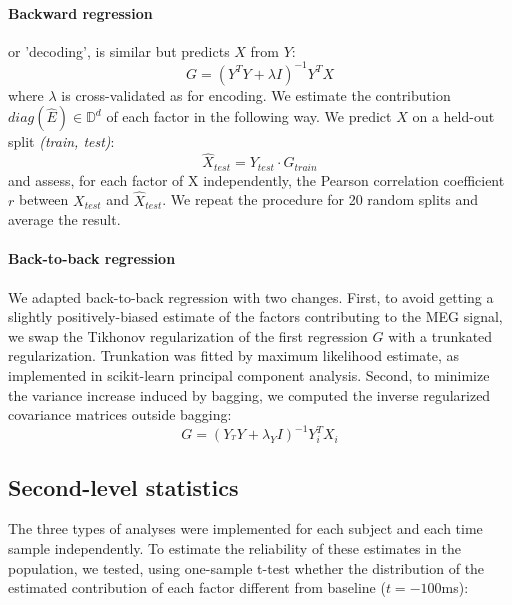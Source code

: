 \paragraph{Backward regression} or 'decoding', is similar but predicts $X$ from $Y$:
\begin{equation} G = (Y^{T}Y+\lambda I)^{-1} Y^{T}X \end{equation}
where $\lambda$ is cross-validated as for encoding. We estimate the
contribution $diag(\hat E) \in\mathbb{D}^{d} $ of each factor in the following
way. We predict $X$ on a held-out split \textit{(train, test)}:
\begin{equation} \hat X_{test} = Y_{test}\cdot G_{train} \end{equation}
and assess, for each factor of X independently, the Pearson correlation
coefficient $r$ between $X_{test}$ and $\hat X_{test}$. We repeat the procedure
for 20 random splits and average the result.

\paragraph{Back-to-back regression} We adapted back-to-back regression with two
changes. First, to avoid getting a slightly positively-biased estimate of the
factors contributing to the MEG signal, we swap the Tikhonov regularization of
the first regression $G$ with a trunkated regularization. Trunkation was fitted
 by maximum likelihood estimate, as implemented in scikit-learn principal
 component analysis. Second, to minimize the variance increase induced by
 bagging, we computed the inverse regularized covariance matrices outside
 bagging:
\begin{equation}
G = (Y_^T Y+\lambda_Y I)^{-1} Y_i^T X_i
\end{equation}


\subsection{Second-level statistics}

The three types of analyses were implemented for each subject and each time
sample independently.  To estimate the reliability of these estimates in the
population, we tested, using one-sample t-test whether the distribution of the
estimated contribution of each factor different from baseline ($t=-100$ms):

